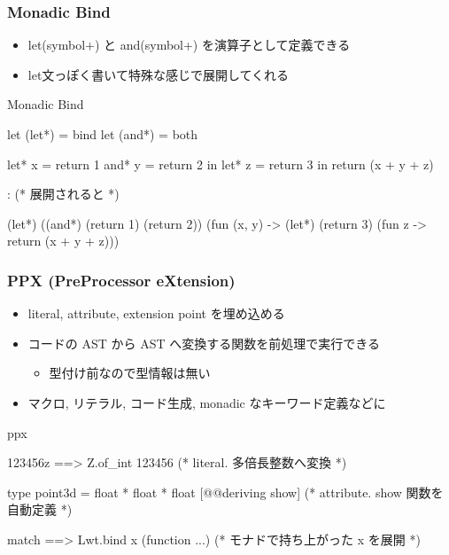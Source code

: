 \documentclass[dvipdfmx,14pt,notheorems,aspectratio=169]{beamer}
\theoremstyle{definition}
\begin{document}
    \begin{frame}[fragile]\frametitle{Monadic Bind}
        \begin{itemize}
            \item let(symbol+) と and(symbol+) を演算子として定義できる
            \item let文っぽく書いて特殊な感じで展開してくれる
        \end{itemize}
        \begin{exampleblock}{Monadic Bind}
            \scriptsize
            \begin{verbatimtab}
let (let*) = bind
let (and*) = both

let* x = return 1 and* y = return 2 in
let* z = return 3 in
return (x + y + z)

 : (* 展開されると *)

(let*) ((and*) (return 1) (return 2)) (fun (x, y) ->
(let*) (return 3) (fun z ->
return (x + y + z)))\end{verbatimtab}
        \end{exampleblock}
    \end{frame}


    \begin{frame}[fragile]\frametitle{PPX (PreProcessor eXtension)\cite{ppx}}
        {\small
        \begin{itemize}
            \item literal, attribute, extension point を埋め込める
            \item コードの AST から AST へ変換する関数を前処理で実行できる
            \begin{itemize}
                \item 型付け前なので型情報は無い
            \end{itemize}
            \item  マクロ, リテラル, コード生成, monadic なキーワード定義などに
        \end{itemize}
        }
        \begin{exampleblock}{ppx}
            \scriptsize
            \begin{verbatimtab}
123456z ==> Z.of_int 123456 (* literal. 多倍長整数へ変換 *)

type point3d = float * float * float
[@@deriving show] (* attribute. show 関数を自動定義 *)

match%
==> Lwt.bind x (function ...) (* モナドで持ち上がった x を展開 *)\end{verbatimtab}
        \end{exampleblock}
    \end{frame}
\end{document}
